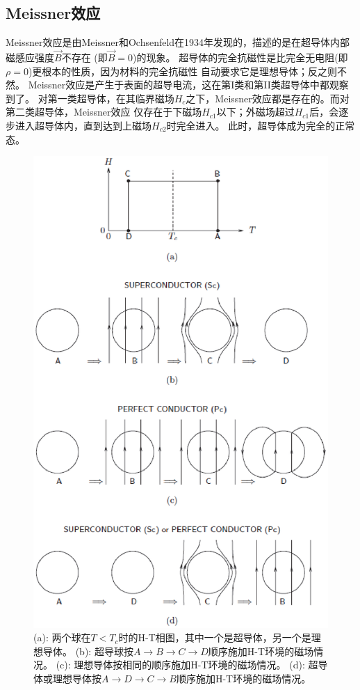 \subsection{Meissner效应}
Meissner效应是由Meissner和Ochsenfeld在1934年发现的，描述的是在超导体内部磁感应强度$\vec{B}$不存在
(即$\vec{B}=0$)的现象。
超导体的完全抗磁性是比完全无电阻(即$\rho=0$)更根本的性质，因为材料的完全抗磁性
自动要求它是理想导体；反之则不然。
Meissner效应是产生于表面的超导电流，这在第I类和第II类超导体中都观察到了。
对第一类超导体，在其临界磁场$H_c$之下，Meissner效应都是存在的。而对第二类超导体，Meissner效应
仅存在于下磁场$H_{c1}$以下；外磁场超过$H_{c1}$后，会逐步进入超导体内，直到达到上磁场$H_{c2}$时完全进入。
此时，超导体成为完全的正常态。
\begin{figure}
  \centering
 \includegraphics[scale=0.7]{chpt1/figs/fig1.1.eps}
  \caption{
(a): 两个球在$T <T_c$时的H-T相图，其中一个是超导体，另一个是理想导体。
(b): 超导球按$ A\rightarrow B\rightarrow C\rightarrow D$顺序施加H-T环境的磁场情况。
(c): 理想导体按相同的顺序施加H-T环境的磁场情况。
(d): 超导体或理想导体按$A\rightarrow D\rightarrow C\rightarrow B$顺序施加H-T环境的磁场情况。}
\end{figure}

